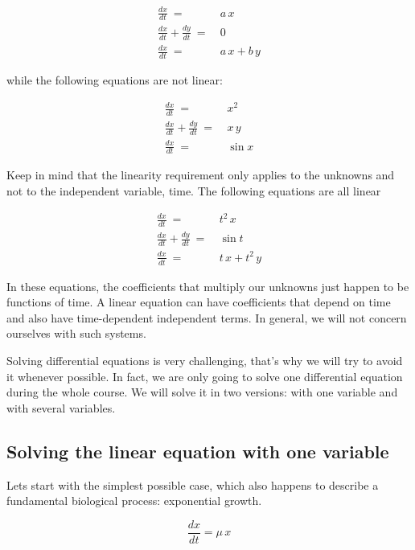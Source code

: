 \documentclass{tufte-book} %
\begin{document}
\begin{align}
	\frac{dx}{dt} \: = \: &  a \, x	\nonumber\\
	\frac{dx}{dt} + \frac{dy}{dt}\: = \: &  0 \nonumber\\
	\frac{dx}{dt} \: = \: &  a \, x + b \, y \nonumber
\end{align}

while the following equations are not linear:

\begin{align}
	\frac{dx}{dt} \: = \: &  x^2	\nonumber\\
	\frac{dx}{dt} + \frac{dy}{dt}\: = \: &  x \, y \nonumber\\
	\frac{dx}{dt} \: = \: &  \sin x \nonumber
\end{align}

Keep in mind that the linearity requirement only applies to the unknowns and not to the independent variable, time. The following equations are all linear


\begin{align}
	\frac{dx}{dt} \: = \: &  t^2 \, x	\nonumber\\
	\frac{dx}{dt} + \frac{dy}{dt}\: = \: &  \sin t \nonumber\\
	\frac{dx}{dt} \: = \: &  t \, x + t^2 \, y \nonumber
\end{align}

In these equations, the coefficients that multiply our unknowns just happen to be functions of time. A linear equation can have coefficients that depend on time and also have time-dependent independent terms. In general, we will not concern ourselves with such systems.



Solving differential equations is very challenging, that's why we will try to avoid it whenever possible. In fact, we are only going to solve one differential equation during the whole course. We will solve it in two versions: with one variable and with several variables.

\subsection{Solving the linear equation with one variable}

Lets start with the simplest possible case, which also happens to describe a fundamental biological process: exponential growth.

\begin{equation}
	\label{odexp}
	\frac{dx}{dt} = \mu \, x 
\end{equation}
\end{document}
